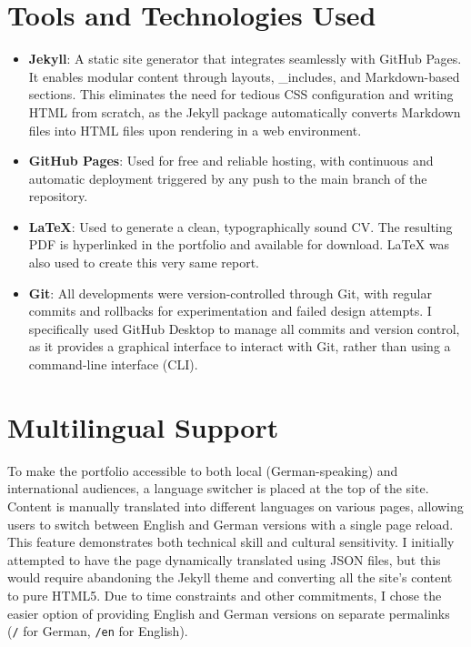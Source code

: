 \section{Tools and Technologies Used}
\begin{itemize}
	\item \textbf{Jekyll}: A static site generator that integrates seamlessly with GitHub Pages. It enables modular content through layouts, \_includes, and Markdown-based sections. This eliminates the need for tedious CSS configuration and writing HTML from scratch, as the Jekyll package automatically converts Markdown files into HTML files upon rendering in a web environment.
	\item \textbf{GitHub Pages}: Used for free and reliable hosting, with continuous and automatic deployment triggered by any push to the main branch of the repository.
	\item \textbf{LaTeX}: Used to generate a clean, typographically sound CV. The resulting PDF is hyperlinked in the portfolio and available for download. LaTeX was also used to create this very same report.
	\item \textbf{Git}: All developments were version-controlled through Git, with regular commits and rollbacks for experimentation and failed design attempts. I specifically used GitHub Desktop to manage all commits and version control, as it provides a graphical interface to interact with Git, rather than using a command-line interface (CLI).
\end{itemize}

\section{Multilingual Support}
To make the portfolio accessible to both local (German-speaking) and international audiences, a language switcher is placed at the top of the site. Content is manually translated into different languages on various pages, allowing users to switch between English and German versions with a single page reload. This feature demonstrates both technical skill and cultural sensitivity. I initially attempted to have the page dynamically translated using JSON files, but this would require abandoning the Jekyll theme and converting all the site’s content to pure HTML5. Due to time constraints and other commitments, I chose the easier option of providing English and German versions on separate permalinks (\verb|/| for German, \verb|/en| for English).\par